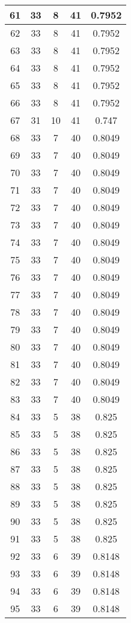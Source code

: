 \documentclass[letterpaper, 12pt]{article}
\begin{document}
\begin{longtable}{|c|c|c|c|c|}
\hline
61 & 33 & 8 & 41 & 0.7952 \\
\hline
62 & 33 & 8 & 41 & 0.7952 \\
\hline
63 & 33 & 8 & 41 & 0.7952 \\
\hline
64 & 33 & 8 & 41 & 0.7952 \\
\hline
65 & 33 & 8 & 41 & 0.7952 \\
\hline
66 & 33 & 8 & 41 & 0.7952 \\
\hline
67 & 31 & 10 & 41 & 0.747 \\
\hline
68 & 33 & 7 & 40 & 0.8049 \\
\hline
69 & 33 & 7 & 40 & 0.8049 \\
\hline
70 & 33 & 7 & 40 & 0.8049 \\
\hline
71 & 33 & 7 & 40 & 0.8049 \\
\hline
72 & 33 & 7 & 40 & 0.8049 \\
\hline
73 & 33 & 7 & 40 & 0.8049 \\
\hline
74 & 33 & 7 & 40 & 0.8049 \\
\hline
75 & 33 & 7 & 40 & 0.8049 \\
\hline
76 & 33 & 7 & 40 & 0.8049 \\
\hline
77 & 33 & 7 & 40 & 0.8049 \\
\hline
78 & 33 & 7 & 40 & 0.8049 \\
\hline
79 & 33 & 7 & 40 & 0.8049 \\
\hline
80 & 33 & 7 & 40 & 0.8049 \\
\hline
81 & 33 & 7 & 40 & 0.8049 \\
\hline
82 & 33 & 7 & 40 & 0.8049 \\
\hline
83 & 33 & 7 & 40 & 0.8049 \\
\hline
84 & 33 & 5 & 38 & 0.825 \\
\hline
85 & 33 & 5 & 38 & 0.825 \\
\hline
86 & 33 & 5 & 38 & 0.825 \\
\hline
87 & 33 & 5 & 38 & 0.825 \\
\hline
88 & 33 & 5 & 38 & 0.825 \\
\hline
89 & 33 & 5 & 38 & 0.825 \\
\hline
90 & 33 & 5 & 38 & 0.825 \\
\hline
91 & 33 & 5 & 38 & 0.825 \\
\hline
92 & 33 & 6 & 39 & 0.8148 \\
\hline
93 & 33 & 6 & 39 & 0.8148 \\
\hline
94 & 33 & 6 & 39 & 0.8148 \\
\hline
95 & 33 & 6 & 39 & 0.8148 \\

\end{longtable}
\end{document}
